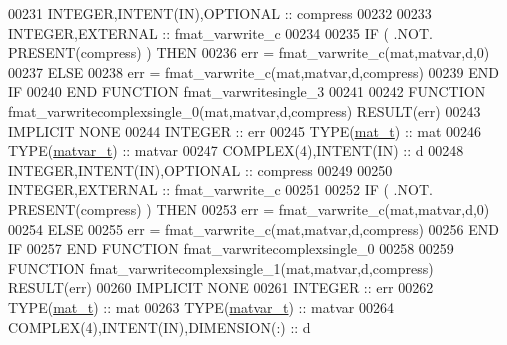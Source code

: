 \begin{DoxyCode}
00231     \textcolor{keywordtype}{INTEGER},\textcolor{keywordtype}{INTENT(IN)},\textcolor{keywordtype}{OPTIONAL}              :: compress
00232 
00233     \textcolor{keywordtype}{INTEGER},\textcolor{keywordtype}{EXTERNAL}                         :: fmat\_varwrite\_c
00234 
00235     \textcolor{keywordflow}{IF} ( .NOT. \textcolor{keyword}{PRESENT}(compress) ) \textcolor{keywordflow}{THEN}
00236         err = fmat\_varwrite\_c(mat,matvar,d,0)
00237     \textcolor{keywordflow}{ELSE}
00238         err = fmat\_varwrite\_c(mat,matvar,d,compress)
00239 \textcolor{keywordflow}{    END IF}
00240 \textcolor{keyword}{END FUNCTION }fmat\_varwritesingle\_3
00241 
00242 \textcolor{keyword}{FUNCTION }fmat\_varwritecomplexsingle\_0(mat,matvar,d,compress) \textcolor{keyword}{RESULT}(err)
00243 \textcolor{keywordtype}{IMPLICIT NONE}
00244     \textcolor{keywordtype}{INTEGER}                                  :: err
00245     \textcolor{keywordtype}{TYPE}(\hyperlink{group___m_a_t_gab0fc888f5a5d79943b16284b1f91c2e8}{mat\_t})                              :: mat
00246     \textcolor{keywordtype}{TYPE}(\hyperlink{group___m_a_t_structmatvar__t}{matvar\_t})                           :: matvar
00247     \textcolor{keywordtype}{COMPLEX(4)},\textcolor{keywordtype}{INTENT(IN)}                    :: d
00248     \textcolor{keywordtype}{INTEGER},\textcolor{keywordtype}{INTENT(IN)},\textcolor{keywordtype}{OPTIONAL}              :: compress
00249 
00250     \textcolor{keywordtype}{INTEGER},\textcolor{keywordtype}{EXTERNAL}                         :: fmat\_varwrite\_c
00251 
00252     \textcolor{keywordflow}{IF} ( .NOT. \textcolor{keyword}{PRESENT}(compress) ) \textcolor{keywordflow}{THEN}
00253         err = fmat\_varwrite\_c(mat,matvar,d,0)
00254     \textcolor{keywordflow}{ELSE}
00255         err = fmat\_varwrite\_c(mat,matvar,d,compress)
00256 \textcolor{keywordflow}{    END IF}
00257 \textcolor{keyword}{END FUNCTION }fmat\_varwritecomplexsingle\_0
00258 
00259 \textcolor{keyword}{FUNCTION }fmat\_varwritecomplexsingle\_1(mat,matvar,d,compress) \textcolor{keyword}{RESULT}(err)
00260 \textcolor{keywordtype}{IMPLICIT NONE}
00261     \textcolor{keywordtype}{INTEGER}                                  :: err
00262     \textcolor{keywordtype}{TYPE}(\hyperlink{group___m_a_t_gab0fc888f5a5d79943b16284b1f91c2e8}{mat\_t})                              :: mat
00263     \textcolor{keywordtype}{TYPE}(\hyperlink{group___m_a_t_structmatvar__t}{matvar\_t})                           :: matvar
00264     \textcolor{keywordtype}{COMPLEX(4)},\textcolor{keywordtype}{INTENT(IN)},\textcolor{keywordtype}{DIMENSION(:)}  :: d

\end{DoxyCode}
